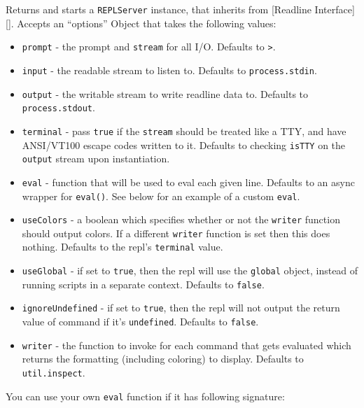 Returns and starts a \texttt{REPLServer} instance, that inherits from
{[}Readline Interface{]}{[}{]}. Accepts an ``options'' Object that takes
the following values:

\begin{itemize}
\item
  \texttt{prompt} - the prompt and \texttt{stream} for all I/O. Defaults
  to \texttt{\textgreater{}}.
\item
  \texttt{input} - the readable stream to listen to. Defaults to
  \texttt{process.stdin}.
\item
  \texttt{output} - the writable stream to write readline data to.
  Defaults to \texttt{process.stdout}.
\item
  \texttt{terminal} - pass \texttt{true} if the \texttt{stream} should
  be treated like a TTY, and have ANSI/VT100 escape codes written to it.
  Defaults to checking \texttt{isTTY} on the \texttt{output} stream upon
  instantiation.
\item
  \texttt{eval} - function that will be used to eval each given line.
  Defaults to an async wrapper for \texttt{eval()}. See below for an
  example of a custom \texttt{eval}.
\item
  \texttt{useColors} - a boolean which specifies whether or not the
  \texttt{writer} function should output colors. If a different
  \texttt{writer} function is set then this does nothing. Defaults to
  the repl's \texttt{terminal} value.
\item
  \texttt{useGlobal} - if set to \texttt{true}, then the repl will use
  the \texttt{global} object, instead of running scripts in a separate
  context. Defaults to \texttt{false}.
\item
  \texttt{ignoreUndefined} - if set to \texttt{true}, then the repl will
  not output the return value of command if it's \texttt{undefined}.
  Defaults to \texttt{false}.
\item
  \texttt{writer} - the function to invoke for each command that gets
  evaluated which returns the formatting (including coloring) to
  display. Defaults to \texttt{util.inspect}.
\end{itemize}

You can use your own \texttt{eval} function if it has following
signature:

\begin{Shaded}
\begin{Highlighting}[]
 
  \NormalTok{(}
\NormalTok{\}}
\end{Highlighting}
\end{Shaded}

